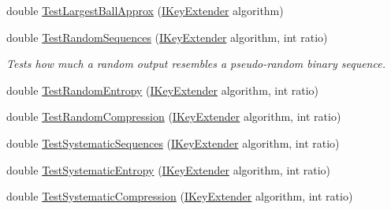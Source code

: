 \begin{DoxyCompactItemize}
\item 
double \hyperlink{class_crypto_1_1_function_testing_a937d2b136d13f2bc57ca3c03778c763e}{Test\+Largest\+Ball\+Approx} (\hyperlink{interface_crypto_1_1_i_key_extender}{I\+Key\+Extender} algorithm)
\item 
double \hyperlink{class_crypto_1_1_function_testing_acf3f02d42487bc168ce29e431ced28f6}{Test\+Random\+Sequences} (\hyperlink{interface_crypto_1_1_i_key_extender}{I\+Key\+Extender} algorithm, int ratio)
\begin{DoxyCompactList}\small\item\em Tests how much a random output resembles a pseudo-\/random binary sequence. \end{DoxyCompactList}\item 
double \hyperlink{class_crypto_1_1_function_testing_a9a647990f55860fb5c1703e4734a78e3}{Test\+Random\+Entropy} (\hyperlink{interface_crypto_1_1_i_key_extender}{I\+Key\+Extender} algorithm, int ratio)
\item 
double \hyperlink{class_crypto_1_1_function_testing_a29540726fa140a1cf1d2b637af553233}{Test\+Random\+Compression} (\hyperlink{interface_crypto_1_1_i_key_extender}{I\+Key\+Extender} algorithm, int ratio)
\item 
double \hyperlink{class_crypto_1_1_function_testing_a082771a8c25d3ac4b29906cbd73fb584}{Test\+Systematic\+Sequences} (\hyperlink{interface_crypto_1_1_i_key_extender}{I\+Key\+Extender} algorithm, int ratio)
\item 
double \hyperlink{class_crypto_1_1_function_testing_a38ff139e200ca760a150fd23f9b8c754}{Test\+Systematic\+Entropy} (\hyperlink{interface_crypto_1_1_i_key_extender}{I\+Key\+Extender} algorithm, int ratio)
\item 
double \hyperlink{class_crypto_1_1_function_testing_a3e1bedf80b820d257984dbae03d0e0e1}{Test\+Systematic\+Compression} (\hyperlink{interface_crypto_1_1_i_key_extender}{I\+Key\+Extender} algorithm, int ratio)
\end{DoxyCompactItemize}
